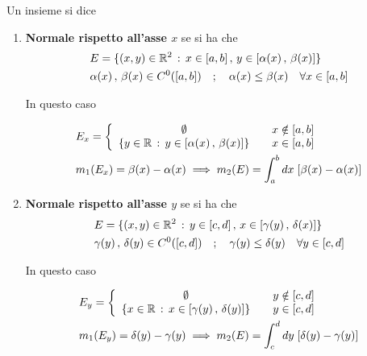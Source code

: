 Un insieme si dice
\begin{enumerate}
	\item \textbf{Normale rispetto all'asse $x$} se si ha che
	\begin{align}
		{}&E= \{ (x,y)\in \mathbb{R}^2 \, : \, x\in[a,b] \, , \, y \in [\alpha(x) \, , \, \beta(x)]   \}\\
		&\alpha(x) \, , \, \beta(x) \in C^0([a,b]) \quad ; \quad \alpha(x) \leq \beta(x) \quad \forall x \in [a,b]
	\end{align}
	\begin{figure}[!htb]
	\end{figure}
	
	In questo caso
	
	\begin{align}
		{}&E_x = \left\{\begin{array}{cc} \emptyset \quad {}& x \notin [a,b] \\ \{  y\in \mathbb{R} \, : \, y \in [\alpha(x) \, , \, \beta(x)]  \} \quad & x \in [a,b] \end{array}\right. \\
		& m_1(E_x) = \beta(x) - \alpha(x) \implies m_2(E) = \int_{a}^{b} dx \; [\beta(x) - \alpha(x)]
	\end{align}
	
	
	
	\item \textbf{Normale rispetto all'asse $y$} se si ha che
	\begin{align}
		{}&E= \{ (x,y)\in \mathbb{R}^2 \, : \, y\in[c,d] \, , \, x \in [\gamma(y) \, , \, \delta(x)]   \}\\
		&\gamma(y) \, , \, \delta(y) \in C^0([c,d]) \quad ; \quad \gamma(y) \leq \delta(y) \quad \forall y \in [c,d]
	\end{align}
	\begin{figure}[!htb]
	\end{figure}
	In questo caso
	
	\begin{align}
		{}&E_y = \left\{\begin{array}{cc} \emptyset \quad {}& y \notin [c,d] \\ \{  x\in \mathbb{R} \, : \, x \in [\gamma(y) \, , \, \delta(y)]  \} \quad & y \in [c,d] \end{array}\right. \\
		& m_1(E_y) = \delta(y) - \gamma(y) \implies m_2(E) = \int_{c}^{d} dy \; [\delta(y) - \gamma(y)]
	\end{align}
\end{enumerate}

